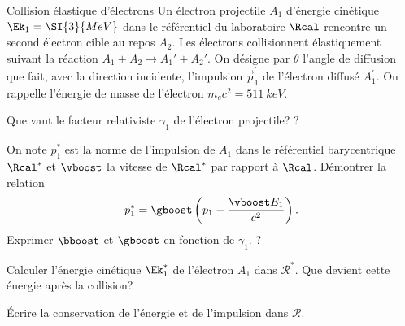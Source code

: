 \begin{exo}[PC][3][TD]{Collision élastique d'électrons}
Un électron projectile $A_{1}$ d'énergie cinétique ${\Ek}_1 =\SI{3}{MeV}$ dans le référentiel du laboratoire $\Rcal$ \nobreak rencontre un second électron cible au repos $A_{2}$. Les électrons collisionnent élastiquement suivant la réaction $A_1 + A_2 \rightarrow A_1' + A_2'$. On désigne par $\theta$ l'angle de diffusion que fait, avec la direction incidente, l’impulsion $\Vec{p}_{\!1}^{\prime}$ de l'électron diffusé $A_{1}^{\prime}$.
On rappelle l’énergie de masse de l’électron $m_{e}c^2=\SI{511}{keV}$.

\begin{quest}
  \item Que vaut le facteur relativiste $\gamma_{1}$ de l'électron projectile? \AN ?

  \item On note $p_{1}^{*}$ est la norme de l'impulsion de $A_{1}$ dans le référentiel barycentrique $\Rcal^{*}$ et $\vboost$ la vitesse de $\Rcal^{*}$ par rapport à $\Rcal$. Démontrer la relation
  \begin{equation}
    p_{1}^{*}=\gboost\left(p_{1}-\frac{\vboost E_{1}}{c^{2}}\right).
  \end{equation}
Exprimer $\bboost$ et $\gboost$ en fonction de $\gamma_1$. \AN ?

  
  
  
  \item Calculer l’énergie cinétique $\Ek_1^*$ de l’électron $A_1$ dans $\mathcal{R}^{*}$. Que devient cette énergie après la collision?
  
  \item Écrire la conservation de l’énergie et de l’impulsion dans $\mathcal{R}$.
  

\end{quest}
\end{exo}
